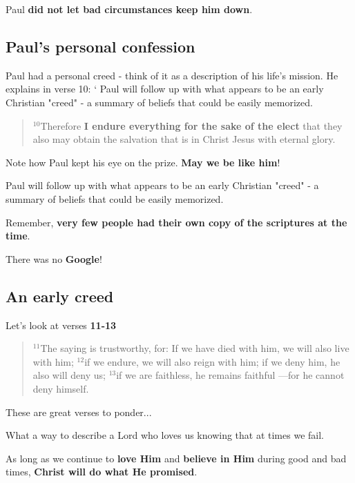 \documentclass[12pt]{article} %
\newcommand{\superscript}[1]{\ensuremath{^{\textrm{#1}}}}
\begin{document}
Paul \textbf{did not let bad circumstances keep him down}.

\subsection{Paul's personal confession }

Paul had a personal creed - think of it as a description of his life's 
mission. He explains in verse 10:
`
Paul will follow up with what appears to be an early Christian "creed" -
a summary of beliefs that could be easily memorized.


\begin{quote}
\superscript{10}Therefore \textbf{I endure everything for the sake of the elect}
 that they also may obtain the salvation that is in Christ Jesus with eternal glory.
\end{quote}

Note how Paul kept his eye on the prize. \textbf{May we be like him}! 



Paul will follow up with what appears to be an early Christian "creed" -
a summary of beliefs that could be easily memorized.

Remember, \textbf{very few people had their own copy of the scriptures at the time}.

There was no \textbf{Google}! 

\subsection{An early creed}

Let's look at verses \textbf{11-13}

\begin{quote}

\superscript{11}The saying is trustworthy, for:
If we have died with him, we will also live with him;     
\superscript{12}if we endure, we will also reign with him;     
if we deny him, he also will deny us;     
\superscript{13}if we are faithless, he remains faithful
—for he cannot deny himself.
\end{quote}

These are great verses to ponder...



What a way to describe a Lord who loves us knowing that at times
we fail.

As long as we continue to \textbf{love Him} and \textbf{believe in Him}
during good and bad times, \textbf{Christ will do what He promised}.
\end{document}
